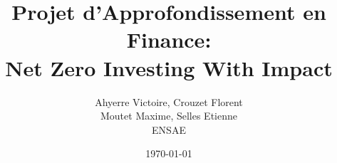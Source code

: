 \documentclass{article}
\theoremstyle{definition}
\theoremstyle{plain}
\theoremstyle{remark}
\newcommand{\includesection}[1]{}
\begin{document}
\title{\textbf{\Large{Projet d'Approfondissement en Finance:\\ Net Zero Investing With Impact}}}
\author{Ahyerre Victoire, Crouzet Florent\\
 Moutet Maxime, Selles Etienne \\
\small ENSAE}
\date{\today}
\maketitle

\begin{abstract}
\end{abstract}


\includesection{introduction}
\includesection{definitions-and-metrics}
\includesection{description-method}
\includesection{conclusion}





\end{document}
